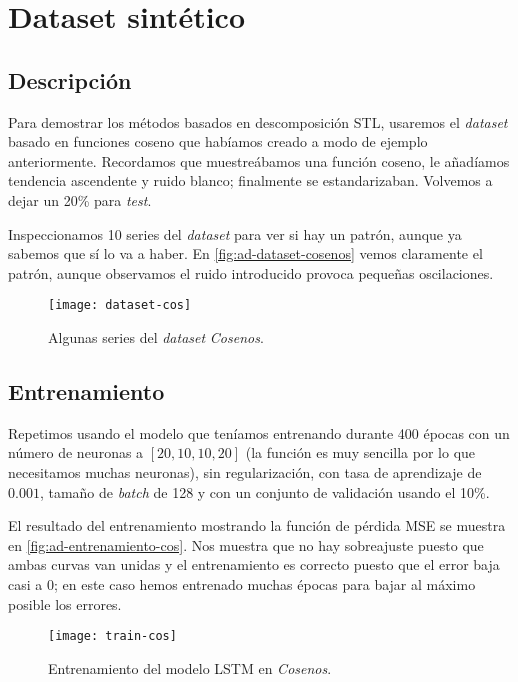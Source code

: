 \section{Dataset sintético}

\subsection{Descripción}

Para demostrar los métodos basados en descomposición STL, usaremos el \emph{dataset} basado en funciones coseno que habíamos creado a modo de ejemplo anteriormente. Recordamos que muestreábamos una función coseno, le añadíamos tendencia ascendente y ruido blanco; finalmente se estandarizaban. Volvemos a dejar un 20\% para \emph{test}.

Inspeccionamos 10 series del \emph{dataset}  para ver si hay un patrón, aunque ya sabemos que sí lo va a haber. En \autoref{fig:ad-dataset-cosenos} vemos claramente el patrón, aunque observamos el ruido introducido provoca pequeñas oscilaciones.

\begin{figure}[htpb]
  \centering
  \texttt{[image: dataset-cos]}
  \caption{Algunas series del \emph{dataset} \emph{Cosenos}.}
  \label{fig:ad-dataset-cosenos}
\end{figure}

\subsection{Entrenamiento}

Repetimos usando el modelo que teníamos entrenando durante 400 épocas con un número de neuronas a $[20, 10, 10, 20]$ (la función es muy sencilla por lo que necesitamos muchas neuronas), sin regularización, con tasa de aprendizaje de $0.001$, tamaño de \emph{batch} de 128 y con un conjunto de validación usando el 10\%.

El resultado del entrenamiento mostrando la función de pérdida MSE se muestra en \autoref{fig:ad-entrenamiento-cos}. Nos muestra que no hay sobreajuste puesto que ambas curvas van unidas y el entrenamiento es correcto puesto que el error baja casi a 0; en este caso hemos entrenado muchas épocas para bajar al máximo posible los errores.

\begin{figure}[htpb]
  \centering
  \texttt{[image: train-cos]}
  \caption{Entrenamiento del modelo LSTM en \emph{Cosenos}.}
  \label{fig:ad-entrenamiento-cos}
\end{figure}

